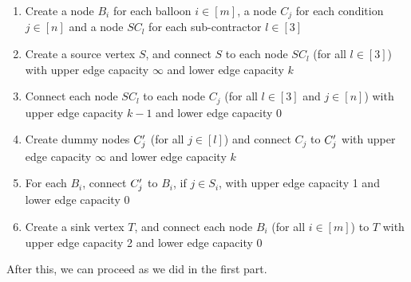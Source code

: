 \documentclass{article}
\begin{document}
\begin{question}
\begin{qpart}{2}
		\begin{enumerate}
			\item Create a node $B_i$ for each balloon $i \in [m]$, a node $C_j$ for each condition $j \in [n]$ and a node $SC_l$ for each sub-contractor $l \in [3]$
			\item Create a source vertex $S$, and connect $S$ to each node $SC_l$ (for all $l \in [3]$) with upper edge capacity $\infty$ and lower edge capacity $k$
			\item Connect each node $SC_l$ to each node $C_j$ (for all $l \in [3]$ and $j \in [n]$) with upper edge capacity $k - 1$ and lower edge capacity $0$
			\item Create dummy nodes $C^{\prime}_j$ (for all $j \in [l]$) and connect $C_j$ to $C^{\prime}_j$ with upper edge capacity $\infty$ and lower edge capacity $k$
			\item For each $B_i$, connect $C^{\prime}_j$ to $B_i$, if $j \in S_i$, with upper edge capacity 1 and lower edge capacity 0
			\item Create a sink vertex $T$, and connect each node $B_i$ (for all $i \in [m]$) to $T$ with upper edge capacity 2 and lower edge capacity 0
		\end{enumerate}

		After this, we can proceed as we did in the first part.
		
	\end{qpart}

\end{question}
\end{document}
